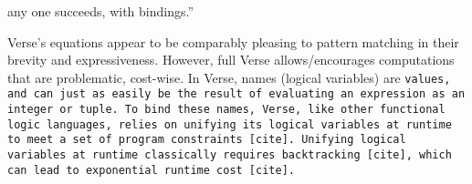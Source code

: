 \documentclass[manuscript,screen,review, 12pt]{acmart}
\begin{document}
    

    
    any one succeeds, with bindings.” 











    

    
    

    Verse's equations appear to be comparably pleasing to pattern matching
    in their brevity and expressiveness. However, full Verse allows/encourages
    computations that are problematic, cost-wise. In Verse, names (logical
    variables) are \tt{values}, and can just as easily be the result of
    evaluating an expression as an integer or tuple. To bind these names, Verse,
    like other functional logic languages, relies on unifying its logical
    variables at runtime to meet a set of program constraints [cite]. Unifying
    logical variables at runtime classically requires backtracking [cite], which
    can lead to exponential runtime cost [cite]. 
        
\end{document}
